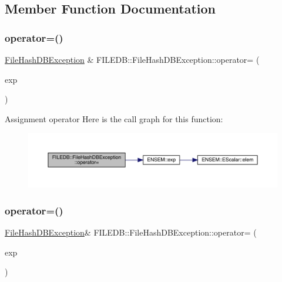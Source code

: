 \subsection{Member Function Documentation}
\mbox{\label{classFILEDB_1_1FileHashDBException_a82f111a87cc81fef84c32f76ebbd15d7}} 
\subsubsection{\texorpdfstring{operator=()}{operator=()}\hspace{0.1cm}{\footnotesize\ttfamily [1/2]}}
{\footnotesize\ttfamily \mbox{\hyperlink{classFILEDB_1_1FileHashDBException}{File\+Hash\+D\+B\+Exception}} \& F\+I\+L\+E\+D\+B\+::\+File\+Hash\+D\+B\+Exception\+::operator= (\begin{DoxyParamCaption}\item[{const \mbox{\hyperlink{classFILEDB_1_1FileHashDBException}{File\+Hash\+D\+B\+Exception}} \&}]{exp }\end{DoxyParamCaption})}

Assignment operator Here is the call graph for this function\+:\nopagebreak
\begin{figure}[H]
\begin{center}
\leavevmode
\includegraphics[width=350pt]{db/dfa/classFILEDB_1_1FileHashDBException_a82f111a87cc81fef84c32f76ebbd15d7_cgraph}
\end{center}
\end{figure}
\mbox{\label{classFILEDB_1_1FileHashDBException_ac7678441c40ae0bf44d1156dbabd596a}} 
\subsubsection{\texorpdfstring{operator=()}{operator=()}\hspace{0.1cm}{\footnotesize\ttfamily [2/2]}}
{\footnotesize\ttfamily \mbox{\hyperlink{classFILEDB_1_1FileHashDBException}{File\+Hash\+D\+B\+Exception}}\& F\+I\+L\+E\+D\+B\+::\+File\+Hash\+D\+B\+Exception\+::operator= (\begin{DoxyParamCaption}\item[{const \mbox{\hyperlink{classFILEDB_1_1FileHashDBException}{File\+Hash\+D\+B\+Exception}} \&}]{exp }\end{DoxyParamCaption})}


